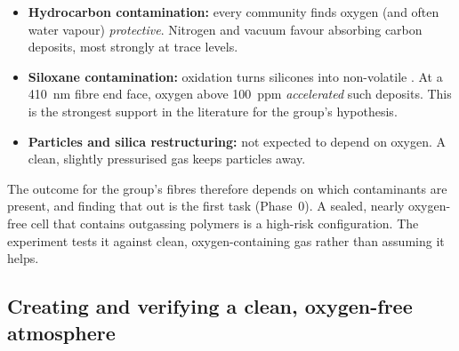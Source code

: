 \begin{keybox}
\begin{itemize}[leftmargin=1em]
  \item \textbf{Hydrocarbon contamination:} every community finds oxygen (and often water vapour)
        \emph{protective}. Nitrogen and vacuum favour absorbing carbon deposits, most strongly at
        trace \Oxy{} levels.
  \item \textbf{Siloxane contamination:} oxidation turns silicones into non-volatile . At a
        \SI{410}{nm} fibre end face, oxygen above \SI{100}{ppm} \emph{accelerated} such deposits. This is
        the strongest support in the literature for the group's hypothesis.
  \item \textbf{Particles and silica restructuring:} not expected to depend on oxygen. A clean, slightly
        pressurised gas keeps particles away.
\end{itemize}
The outcome for the group's fibres therefore depends on which contaminants are present, and finding
that out is the first task (Phase~0). A sealed, nearly oxygen-free cell that contains outgassing
polymers is a high-risk configuration. The experiment tests it against clean, oxygen-containing gas
rather than assuming it helps.
\end{keybox}


\subsection{Creating and verifying a clean, oxygen-free atmosphere}\label{sec:sota-atmosphere}
